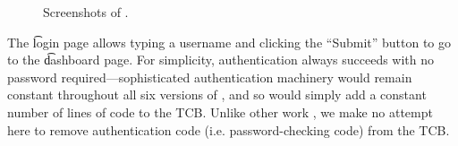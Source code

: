 \begin{refsection}
\begin{figure}
\begin{center}
\caption{Screenshots of \myapp{}.}
\label{screenshots}
\end{center}
\end{figure}

The \t{login} page allows typing a username and clicking the ``Submit'' button to go to the \t{dashboard} page.
%
For simplicity, authentication always succeeds with no password required---sophisticated
authentication machinery would remain constant throughout all six versions of \myapp{},
and so would simply add a constant number of lines of code to the TCB.
%
Unlike other work \cite{cecchetti2017nonmalleable},
we make no attempt here to remove authentication code (i.e. password-checking code) from the TCB.


\end{refsection}
